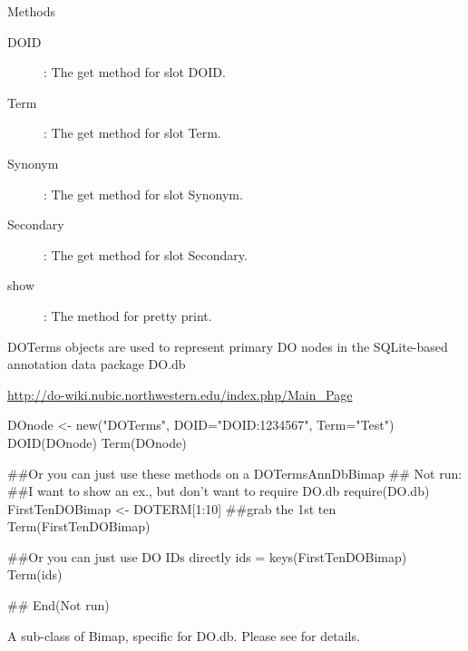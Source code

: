 \documentclass[a4paper]{book}
\begin{document}
%
\begin{Section}{Methods}
\begin{description}

\item[DOID] :
The get method for slot DOID.
\item[Term] :
The get method for slot Term.
\item[Synonym] :
The get method for slot Synonym.
\item[Secondary] :
The get method for slot Secondary.
\item[show] :
The method for pretty print.

\end{description}

\end{Section}
%
\begin{Note}\relax
DOTerms objects are used to represent primary DO nodes in the
SQLite-based annotation data package DO.db
\end{Note}
%
\begin{References}\relax
\url{http://do-wiki.nubic.northwestern.edu/index.php/Main_Page} 
\end{References}
%
\begin{Examples}
\begin{ExampleCode}
  DOnode <- new("DOTerms", DOID="DOID:1234567", Term="Test")
  DOID(DOnode)
  Term(DOnode)

  ##Or you can just use these methods on a DOTermsAnnDbBimap
## Not run: ##I want to show an ex., but don't want to require DO.db
  require(DO.db)
  FirstTenDOBimap <- DOTERM[1:10] ##grab the 1st ten
  Term(FirstTenDOBimap)

  ##Or you can just use DO IDs directly
  ids = keys(FirstTenDOBimap)
  Term(ids)

## End(Not run)
\end{ExampleCode}
\end{Examples}
%
\begin{Description}\relax
A sub-class of  Bimap, specific for DO.db. Please see  for details.
\end{Description}
\end{document}
